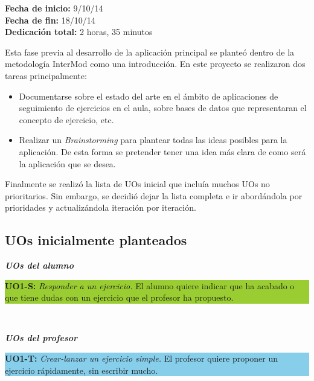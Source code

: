 \begin{flushleft}
\textbf{Fecha de inicio:} 9/10/14\\
\textbf{Fecha de fin:} 18/10/14\\
\textbf{Dedicación total:} 2 horas, 35 minutos\\
\end{flushleft}

Esta fase previa al desarrollo de la aplicación principal se planteó dentro de la metodología InterMod como una introducción. En este proyecto se realizaron dos tareas principalmente:

\begin{itemize}
\item Documentarse sobre el estado del arte en el ámbito de aplicaciones de seguimiento de ejercicios en el aula, sobre bases de datos que representaran el concepto de ejercicio, etc.
\item Realizar un \textit{Brainstorming} para plantear todas las ideas posibles para la aplicación. De esta forma se pretender tener una idea más clara de como será la aplicación que se desea.
\end{itemize}

Finalmente se realizó la lista de UOs inicial que incluía muchos UOs no prioritarios. Sin embargo, se decidió dejar la lista completa e ir abordándola por prioridades y actualizándola iteración por iteración.\\

\subsection{UOs inicialmente planteados}
\label{step0:uos}

\textbf\textit{\large UOs del alumno}\\

\colorbox{YellowGreen}{\parbox[c]{1.0\textwidth}{
	\textbf{UO1-S:} \textit{Responder a un ejercicio.} El alumno quiere indicar que ha acabado o que tiene dudas con 			un ejercicio que el profesor ha propuesto.\\
}}\\

\vspace{0.3cm}

\textbf\textit{\large UOs del profesor}\\

\colorbox{SkyBlue}{\parbox[c]{1.0\textwidth}{
\textbf{UO1-T:} \textit{Crear-lanzar un ejercicio simple.} El profesor quiere proponer un ejercicio rápidamente, sin escribir mucho.\\
}}\\

